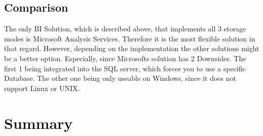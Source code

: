 \documentclass[12pt,a4paper,oneside,
liststotoc, 					%
bibtotoc,						%
titlepage, 						%
headsepline, 					%
BCOR6mm,						%
openany,							%
]{scrreprt}
\begin{document}
\section{Comparison}\label{comparison}
The only BI Solution, which is described above, that implements all 3 storage modes is Microsoft Analysis Services. Therefore it is the most flexible solution in that regard. However, depending on the implementation the other solutions might be a better option. Especially, since Microsofts solution has 2 Downsides. The first 1 being integrated into the SQL server, which forces you to use a specific Database. The other one being only useable on Windows, since it does not support Linux or UNIX.
\chapter{Summary}

\printbibliography
\begin{appendix}
\clearpage
{}						%
\end{appendix}
\end{document}
